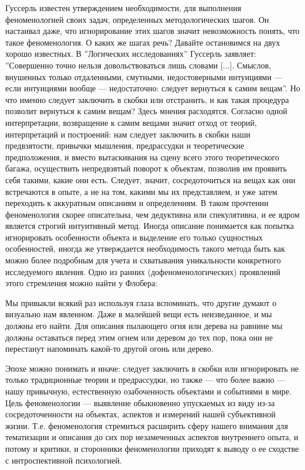 \documentclass[11pt]{book}
\begin{document}
Гуссерль известен утверждением необходимости, для выполнения феноменологией своих задач, определенных методологических шагов. Он настаивал даже, что игнорирование этих шагов значит невозможность понять, что такое феноменология. О каких же шагах речь? Давайте остановимся на двух хорошо известных. В ''Логических исследованиях'' Гуссерль заявляет: ''Совершенно точно нельзя довольствоваться лишь словами [...]. Смыслов, внушенных только отдаленными, смутными, недостоверными интуициями --- если интуициями вообще --- недостаточно: следует вернуться к самим вещам''. Но что именно следует заключить в скобки или отстранить, и как такая процедура позволит вернуться к самим вещам? Здесь мнения расходятся. Согласно одной интерпретации, возвращение к самим вещами значит отход от теорий, интерпретаций и построений: нам следует заключить в скобки наши предвзятости, привычки мышления, предрассудки и теоретические предположения, и вместо вытаскивания на сцену всего этого теоретического багажа, осуществить непредвзятый поворот к объектам, позволив им проявить себя такими, какие они есть. Следует, значит, сосредоточиться на вещах как они встречаются в опыте, а не на том, какими мы их представляем, и уже затем переходить к аккуратным описаниям и определениям. В таком прочтении феноменология скорее описательна, чем дедуктивна или спекулятивна, и ее ядром является строгий интуитивный метод. Иногда описание понимается как попытка игнорировать особенности объекта и выделение его только сущностных особенностей, иногда же утверждается необходимость такого метода быть как можно более подробным для учета и схватывания уникальности конкретного исследуемого явления. Одно из ранних (дофеноменологических) проявлений этого стремления можно найти у Флобера:

\smallskip
{}\relax
{}\relax

Мы привыкли всякий раз используя глаза вспоминать, что другие думают о визуально нам явленном. Даже в малейшей вещи есть неизведанное, и мы должны его найти. Для описания пылающего огня или дерева на равнине мы должны оставаться перед этим огнем или деревом до тех пор, пока они не перестанут напоминать какой-то другой огонь или дерево.

\relax
{}\relax
\smallskip

Эпохе можно понимать и иначе: следует заключить в скобки или игнорировать не только традиционные теории и предрассудки, но также --- что более важно --- нашу привычную, естественную озабоченность объектами и событиями в мире. Цель феноменологии --- выявление обыкновенно упускаемых из виду из-за сосредоточенности на объектах, аспектов и измерений нашей субъективной жизни. Т.е. феноменология стремиться расширить сферу нашего внимания для тематизации и описания до сих пор незамеченных аспектов внутреннего опыта, и потому и критики, и сторонники феноменологии приходят к выводу о ее сходстве с интроспективной психологией.
\end{document}
